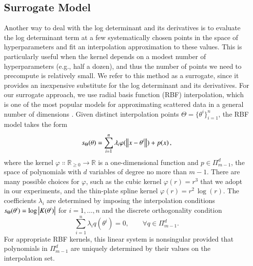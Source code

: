 \subsection{Surrogate Model}\label{sgpsec:rbf}

Another way to deal with the log determinant and its derivatives is to evaluate
the log determinant term at a few systematically chosen points in the space of
hyperparameters and fit an interpolation approximation to these values.  This
is particularly useful when the kernel depends on a modest number of
hyperparameters (e.g., half a dozen), and thus the number of points we need to
precompute is relatively small. We refer to this method as a surrogate, since it
provides an inexpensive substitute for the log determinant and its derivatives.
For our surrogate approach, we use radial basis function (RBF) interpolation,
which is one of the most popular models for approximating scattered data in a
general number of dimensions \citep{buhmann2000radial,fasshauer2007meshfree,
schaback2006kernel,wendland2004scattered}.
Given distinct interpolation points $\Theta=\{\theta^i\}_{i=1}^n$, the RBF model
takes the form
\begin{equation}\label{eq:rbf}
  s_{\Theta}(\theta) = \sum_{i=1}^n \lambda_i \varphi(\left\lVert x - \theta^i\right\rVert) + p
  (x)\,,
\end{equation}
where the kernel $\varphi\Colon\mathbb{R}_{\geq 0} \to \mathbb{R}$ is a
one\hyp{}dimensional function and $p \in \Pi_{m-1}^d$, the space of polynomials
with $d$ variables of degree no more than $m-1$. There are many possible choices
for $\varphi$, such as the cubic kernel $\varphi(r)=r^3$ that we adopt in our
experiments, and the thin-plate spline kernel $\varphi(r)=r^2\,\log(r)$. The
coefficients $\lambda_i$ are determined by imposing the interpolation conditions
$s_{\Theta}(\theta^i) = \log\left\lvert K(\theta^i)\right\rvert$ for $i=1,\ldots,n$ and the
discrete orthogonality condition
\begin{equation}\label{eq:disc_orthg}
  \sum_{i=1}^n \lambda_i q(\theta^i) = 0, \qquad \forall q \in \Pi_{m-1}^d.
\end{equation}
For appropriate RBF kernels, this linear system is nonsingular provided that
polynomials in $\Pi_{m-1}^d$ are uniquely determined by their values on the
interpolation set.